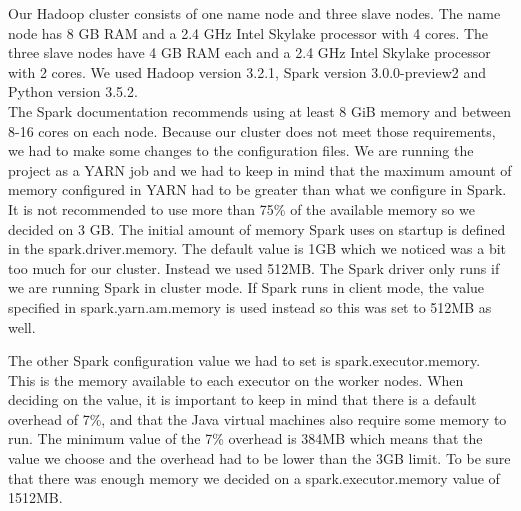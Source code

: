 Our Hadoop cluster consists of one name node and three slave nodes.
The name node has 8 GB RAM and a 2.4 GHz Intel Skylake processor with 4 cores.
The three slave nodes have 4 GB RAM each and a 2.4 GHz Intel Skylake processor with 2 cores.
We used Hadoop version 3.2.1, Spark version 3.0.0-preview2 and Python version 3.5.2.
\\
The Spark documentation recommends using at least 8 GiB memory and between 8-16 cores on each node\cite{SparkHardware}. Because our cluster does not meet those requirements, we had to make some changes to the configuration files. We are running the project as a YARN job and we had to keep in mind that the maximum amount of memory configured in YARN had to be greater than what we configure in Spark. It is not recommended to use more than 75\% of the available memory so we decided on 3 GB. The initial amount of memory Spark uses on startup is defined in the spark.driver.memory. The default value is 1GB which we noticed was a bit too much for our cluster. Instead we used 512MB. The Spark driver only runs if we are running Spark in cluster mode. If Spark runs in client mode, the value specified in spark.yarn.am.memory is used instead so this was set to 512MB as well. 

The other Spark configuration value we had to set is spark.executor.memory. This is the memory available to each executor on the worker nodes. When deciding on the value, it is important to keep in mind that there is a default overhead of 7\%, and that the Java virtual machines also require some memory to run. The minimum value of the 7\% overhead is 384MB\cite{SparkOverhead} which means that the value we choose and the overhead had to be lower than the 3GB limit. To be sure that there was enough memory we decided on a spark.executor.memory value of 1512MB.